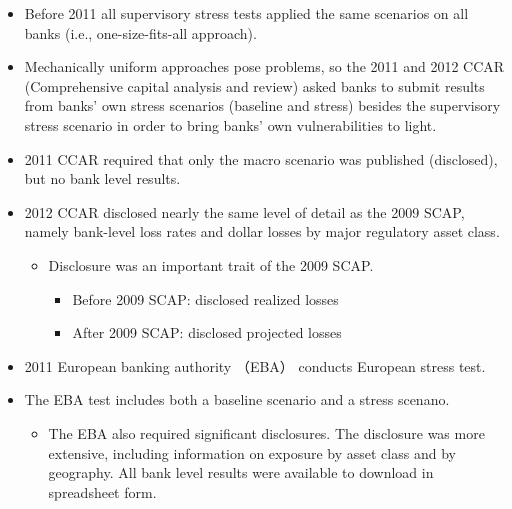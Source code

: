 \begin{itemize}
\begin{table}[h]
\end{table}
\item Before 2011 all supervisory stress tests applied the same scenarios on all banks (i.e., one-size-fits-all approach).
\item Mechanically uniform approaches pose problems, so the 2011 and 2012 CCAR (Comprehensive capital analysis and review) asked banks to submit results from banks' own stress scenarios (baseline and stress) besides the supervisory stress scenario in order to bring banks' own vulnerabilities to light.
\item 2011 CCAR required that only the macro scenario was published (disclosed), but no bank level results.
\item 2012 CCAR disclosed nearly the same level of detail as the 2009 SCAP, namely bank-level loss rates and dollar losses by major regulatory asset class.
    \begin{itemize}
    \item Disclosure was an important trait of the 2009 SCAP.
        \begin{itemize}
        \item Before 2009 SCAP: disclosed realized losses
        \item After 2009 SCAP: disclosed projected losses
        \end{itemize}
    \end{itemize}
\item 2011 European banking authority （EBA） conducts European stress test.
\item The EBA test includes both a baseline scenario and a stress scenano.
    \begin{itemize}
    \item The EBA also required significant disclosures. The disclosure was more extensive, including information on exposure by asset class and by geography. All bank level results were available to download in spreadsheet form.
    \end{itemize}
\end{itemize}



